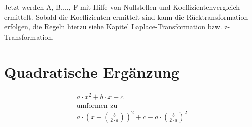 Jetzt werden A, B,$\dots$, F mit Hilfe von Nullstellen und Koeffizientenvergleich ermittelt. 
Sobald die Koeffizienten ermittelt sind kann die Rücktransformation erfolgen, die Regeln hierzu siehe Kapitel Laplace-Transformation bzw. z-Transformation.

\section{Quadratische Ergänzung}

\begin{align}
	a\cdot x^2 + b\cdot x +c\\
	\text{umformen zu}\\
	a \cdot \left( x + \left( \frac{b}{2\cdot a} \right)\right)^2 + c -a \cdot\left(\frac{b}{2\cdot a}\right)^2
\end{align}
